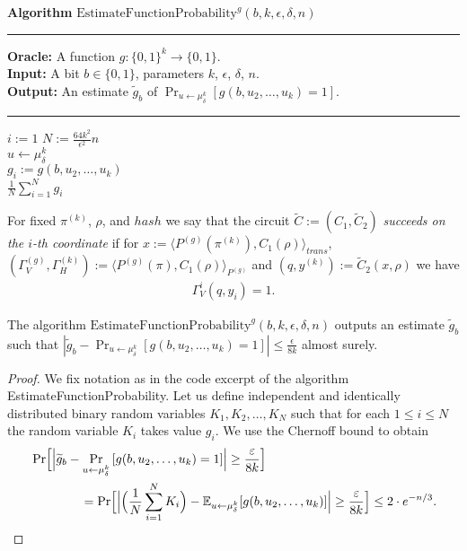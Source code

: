 \begin{codeblock}
  \textbf{Algorithm} $\text{EstimateFunctionProbability}^{g}(b, k, \epsilon, \delta, n)$
  \medskip\hrule
  \textbf{Oracle:} A function $g : \{0,1\}^{k} \rightarrow \{0,1\}$.\\
  \textbf{Input:} A bit $b \in \{0,1\}$, parameters $k$, $\epsilon$, $\delta$, $n$. \\
  \textbf{Output:} An estimate $\widetilde{g}_b$ of $\Pr_{u \leftarrow \mu_{\delta}^{k}}[g(b,u_2, \dotsc, u_k) = 1]$.
  \medskip\hrule
  \For $i:=1$ \To $N := \frac{64k^2}{\epsilon^2} n$ \Do \\
  \IndI $u \leftarrow \mu_{\delta}^{k}$ \\
  \IndI $g_i := g(b, u_2, \dotsc, u_k)$ \\
  \Return $\frac{1}{N} \sum_{i=1}^{N} g_i$
\end{codeblock}
%
For fixed $\pi^{(k)}$, $\rho$, and $hash$ we say that the circuit $\widetilde{C} := (C_1, \widetilde{C}_2)$ \textit{succeeds on the $i$-th coordinate}
if for $x := \langle P^{(g)}(\pi^{(k)}), C_1(\rho) \rangle_{\mathit{trans}}$, $(\Gamma_V^{(g)}, \Gamma_H^{(k)}) := \langle P^{(g)}(\pi), C_1(\rho) \rangle_{P^{(g)}}$ and
$(q, y^{(k)}) := \widetilde{C}_2(x, \rho)$ we have
\begin{align*}
  \Gamma_V^i(q, y_i) = 1.
\end{align*}
%
\begin{lemma}
  \label{lemma:estimate_of_g}
  The algorithm $\text{EstimateFunctionProbability}^{g}(b, k, \epsilon, \delta, n)$ outputs an estimate $\widetilde{g}_b$
  such that $| \widetilde{g}_b - \Pr_{u \leftarrow \mu_{\delta}^{k}}\left[g(b,u_2, \dots, u_k) = 1\right] | \leq \frac{\epsilon}{8k}$ almost surely.
\end{lemma}
%
\begin{proof}
We fix notation as in the code excerpt of the algorithm EstimateFunctionProbability.
Let us define independent and identically distributed binary random variables $K_1, K_2, \dots, K_N$
such that for each $1 \leq i \leq N$ the random variable $K_i$ takes value $g_i$. We use the Chernoff bound to obtain
\begin{align*}
  &\Pr \Bigl[ \Bigl| \widetilde{g}_b - \Pr_{u \leftarrow \mu_{\delta}^{k}}\left[g(b,u_2, \dots, u_k) = 1\right] \Bigr| \geq \frac{\varepsilon}{8k} \Bigr]\\
  &\mbox\qquad\qquad = \Pr \Bigl[\Bigl|\Bigl(\frac{1}{N} \sum_{i=1}^N K_i \Bigr) - \mathbb{E}_{u \leftarrow \mu_{\delta}^k}[g(b,u_2, \dots, u_k)]\Bigr|
    \geq \frac{\varepsilon}{8k} \Bigr] \leq 2 \cdot e^{-n/3}.
\end{align*}
\end{proof}
